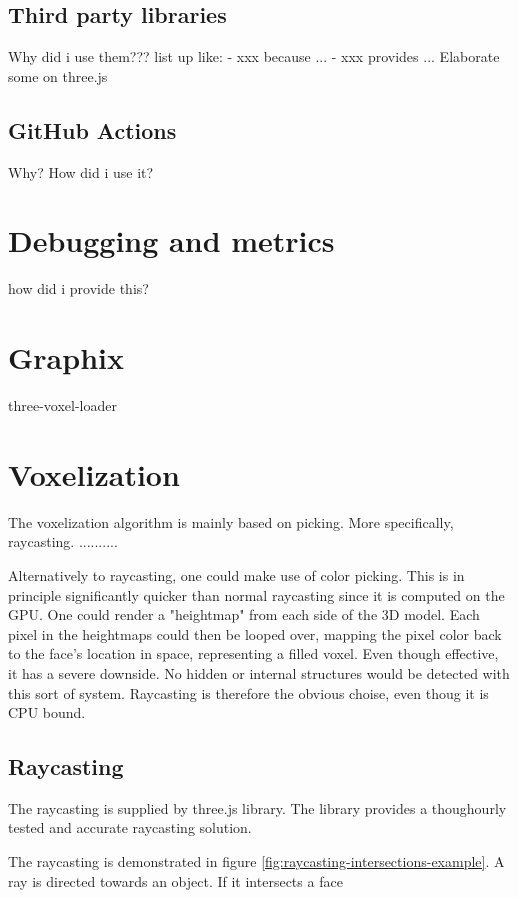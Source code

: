 \subsection{Third party libraries}
Why did i use them???
list up like:
- xxx because ...
- xxx provides ...
Elaborate some on three.js


\subsection{GitHub Actions}
Why? How did i use it?

\section{Debugging and metrics}
how did i provide this?

\section{Graphix}
three-voxel-loader


\section{Voxelization}
The voxelization algorithm is mainly based on picking. More specifically, raycasting. ..........

Alternatively to raycasting, one could make use of color picking. This is in principle significantly quicker than normal raycasting since it is computed on the GPU. One could render a "heightmap" from each side of the 3D model. Each pixel in the heightmaps could then be looped over, mapping the pixel color back to the face's location in space, representing a filled voxel. Even though effective, it has a severe downside. No hidden or internal structures would be detected with this sort of system. Raycasting is therefore the obvious choise, even thoug it is CPU bound.

\subsection{Raycasting}
The raycasting is supplied by three.js library. The library provides a thoughourly tested and accurate raycasting solution.

The raycasting is demonstrated in figure \ref{fig:raycasting-intersections-example}. A ray is directed towards an object. If it intersects a face

